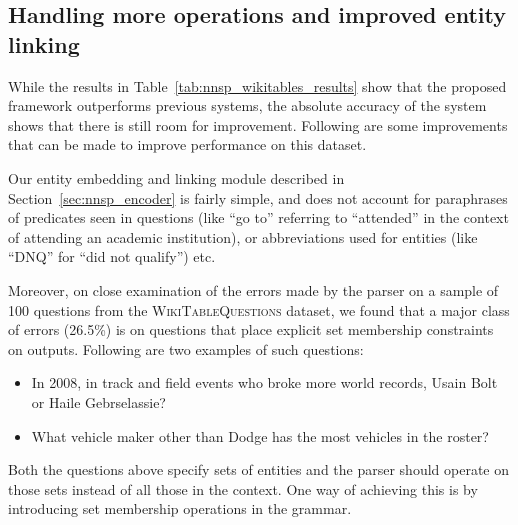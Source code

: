 \subsection{Handling more operations and improved entity linking}
While the results in Table~\ref{tab:nnsp_wikitables_results} show that the proposed framework outperforms previous systems,
the absolute accuracy of the system shows that there is still room for improvement. Following are some improvements that can be made to improve
performance on this dataset.

Our entity embedding and linking module
described in Section~\ref{sec:nnsp_encoder} is fairly simple, and does not account for paraphrases of predicates seen in questions
(like ``go to'' referring to ``attended'' in the context of attending an academic institution), or abbreviations used for entities
(like ``DNQ'' for ``did not qualify'') etc.

Moreover, on close examination of the errors made by the parser on a sample of 100 questions from the \textsc{WikiTableQuestions} dataset,
we found that a major class of errors (26.5\%) is on questions that place explicit set membership constraints on outputs. Following are
two examples of such questions:
\begin{itemize}
 \item In 2008, in track and field events who broke more world records, Usain Bolt or Haile Gebrselassie?
 \item What vehicle maker other than Dodge has the most vehicles in the roster?
\end{itemize}
Both the questions above specify sets of entities and the parser should operate on those sets instead of all those in the context. One way of achieving this
is by introducing set membership operations in the grammar.

